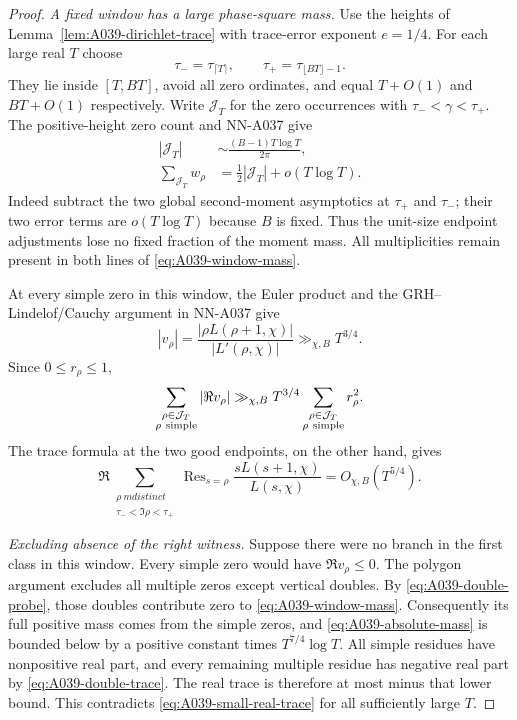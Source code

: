 \begin{proof}
\emph{A fixed window has a large phase-square mass.}
Use the heights of Lemma~\ref{lem:A039-dirichlet-trace} with
trace-error exponent $e=1/4$. For each large real $T$ choose
\[
 \tau_- =\tau_{\lceil T\rceil},\qquad
 \tau_+ =\tau_{\lfloor BT\rfloor-1}.
\]
They lie inside $[T,BT]$, avoid all zero ordinates, and equal
$T+O(1)$ and $BT+O(1)$ respectively. Write $\mathcal J_T$
for the zero occurrences with $\tau_-<\gamma<\tau_+$.
The positive-height zero count and NN-A037 give
\begin{align}\label{eq:A039-window-mass}
 |\mathcal J_T|&\sim\frac{(B-1)T\log T}{2\pi},\\
 \sum_{\mathcal J_T}w_\rho
       &=\frac12|\mathcal J_T|+o(T\log T).
 \nonumber
\end{align}
Indeed subtract the two global second-moment asymptotics at
$\tau_+$ and $\tau_-$; their two error terms are $o(T\log T)$
because $B$ is fixed. Thus the unit-size endpoint adjustments
lose no fixed fraction of the moment mass. All multiplicities
remain present in both lines of \eqref{eq:A039-window-mass}.

At every simple zero in this window, the Euler product and the
GRH--Lindelof/Cauchy argument in NN-A037 give
\[
 |v_\rho|=\frac{|\rho L(\rho+1,\chi)|}{|L'(\rho,\chi)|}
                                      \gg_{\chi,B}T^{3/4}.
\]
Since $0\le r_\rho\le1$,
\begin{equation}\label{eq:A039-absolute-mass}
 \sum_{\substack{\rho\in\mathcal J_T\\\rho\ {\rm simple}}}
             |\Re v_\rho|
 \gg_{\chi,B}T^{3/4}
       \sum_{\substack{\rho\in\mathcal J_T\\\rho\ {\rm simple}}}
                    r_\rho^2.
\end{equation}
The trace formula at the two good endpoints, on the other hand,
gives
\begin{equation}\label{eq:A039-small-real-trace}
 \Re\sum_{\substack{\rho\ {
m distinct}\\\tau_-<\Im\rho<\tau_+}}
       \operatorname{Res}_{s=\rho}
                \frac{sL(s+1,\chi)}{L(s,\chi)}
                              =O_{\chi,B}(T^{5/4}).
\end{equation}

\emph{Excluding absence of the right witness.}
Suppose there were no branch in the first class in this window.
Every simple zero would have $\Re v_\rho\le0$.
The polygon argument excludes all multiple zeros except
vertical doubles. By \eqref{eq:A039-double-probe}, those
doubles contribute zero to \eqref{eq:A039-window-mass}.
Consequently its full positive mass comes from the simple
zeros, and \eqref{eq:A039-absolute-mass} is bounded below by
a positive constant times $T^{7/4}\log T$.
All simple residues have nonpositive real part, and every
remaining multiple residue has negative real part by
\eqref{eq:A039-double-trace}. The real trace is therefore at
most minus that lower bound. This contradicts
\eqref{eq:A039-small-real-trace} for all sufficiently large $T$.


\end{proof}
